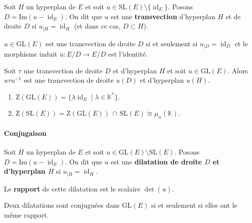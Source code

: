 	
	\begin{definition}
		Soit $H$ un hyperplan de $E$ et soit $u \in \mathrm{SL}(E) \setminus \{ \operatorname{id}_E \}$. Posons $D = \mathrm{Im}(u - \operatorname{id}_E)$. On dit que $u$ est une \textbf{transvection} d'hyperplan $H$ et de droite $D$ si $u_{|H} = \operatorname{id}_H$ (et dans ce cas, $D \subset H$).
	\end{definition}
	
	\begin{proposition}
		$u \in \mathrm{GL}(E)$ est une transvection de droite $D$ si et seulement si $u_{|D} = \operatorname{id}_D$ et le morphisme induit $\overline{u} : E/D \rightarrow E/D$ est l'identité.
	\end{proposition}
	
	\begin{proposition}
		Soit $\tau$ une transvection de droite $D$ et d'hyperplan $H$ et soit $u \in \mathrm{GL}(E)$. Alors $u \tau u^{-1}$ est une transvection de droite $u(D)$ et d'hyperplan $u(H)$.
	\end{proposition}
	
	\begin{corollary}
		\begin{enumerate}
			\item $\mathrm{Z}(\mathrm{GL}(E)) = \{ \lambda \operatorname{id}_E \mid \lambda \in \mathbb{K}^* \}$.
			\item $\mathrm{Z}(\mathrm{SL}(E)) = \mathrm{Z}(\mathrm{GL}(E)) \, \cap \, \mathrm{SL}(E) \cong \mu_n(\mathbb{K})$.
		\end{enumerate}
	\end{corollary}
	
	\paragraph{Conjugaison}
	
	\begin{definition}
		Soit $H$ un hyperplan de $E$ et soit $u \in \mathrm{GL}(E) \setminus \mathrm{SL}(E)$. Posons $D = \mathrm{Im}(u - \operatorname{id}_E)$. On dit que $u$ est une \textbf{dilatation de droite $D$ et d'hyperplan $H$} si $u_{|H} = \operatorname{id}_H$.
		
		\medskip
		Le \textbf{rapport} de cette dilatation est le scalaire $\det(u)$.
	\end{definition}
	
	\begin{proposition}
		Deux dilatations sont conjuguées dans $\mathrm{GL}(E)$ si et seulement si elles ont le même rapport.
	\end{proposition}
	
